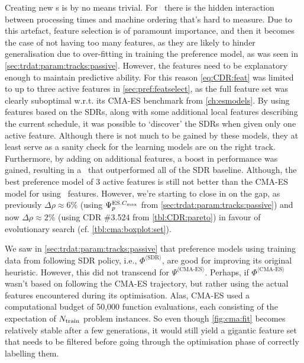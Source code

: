 Creating new \dr s is by no means trivial. For \jsp\ there is 
the hidden interaction between processing times and machine ordering that's 
hard to measure.
Due to this artefact, feature selection is of paramount importance, and then it 
becomes the case of not having too many features, as they are likely to hinder 
generalisation due to over-fitting in training the preference model, as was 
seen in \cref{sec:trdat:param:tracks:passive}. 
However, the features need to be explanatory enough to maintain predictive 
ability. 
For this reason \cref{eq:CDR:feat} was limited to up to three active features 
in \cref{sec:pref:featselect}, as the full feature set was clearly suboptimal 
w.r.t. its CMA-ES benchmark from \cref{ch:esmodels}. 
By using features based on the SDRs, along with some additional local features 
describing the current schedule, it was possible to `discover' the SDRs when 
given only one active feature. 
Although there is not much to be gained by these models, they at least serve as 
a sanity check for the learning models are on the right track. 
Furthermore, by adding on additional features, a boost in performance was 
gained, resulting in a \cdr\ that outperformed all of the SDR baseline. 
Although, the best preference model of 3 active features is still not better 
than the CMA-ES model for  using \NrFeatLocal\ features. 
However, we're starting to close in on the gap, as previously 
$\Delta\rho\approx6\%$ (using $\Psi_p^{\text{ES}.{C_{\max}}}$ from 
\cref{sec:trdat:param:tracks:passive}) and now $\Delta\rho\approx2\%$ (using 
CDR \#3.524 from \cref{tbl:CDR:pareto}) in favour of evolutionary search (cf. 
\cref{tbl:cma:boxplot:set}).



We saw in \cref{sec:trdat:param:tracks:passive} that preference models using 
training data from following SDR policy, i.e., $\Phi^{\langle \text{SDR} 
\rangle}$, are good for improving its original heuristic. However, this did not 
transcend for $\Psi^{\langle \text{CMA-ES} \rangle}$. 
Perhaps, if $\Phi^{\langle \text{CMA-ES} \rangle}$ wasn't based on following 
the CMA-ES trajectory, but rather using the actual features encountered during 
its optimisation. Alas, CMA-ES used a computational budget of 50,000 function 
evaluations, each consisting of the expectation of $N_{\text{train}}$ problem 
instances. So even though \cref{fig:cma:fit} becomes relatively stable after a 
few generations, it would still yield a gigantic feature set that needs to be 
filtered before going through the optimisation phase of correctly labelling 
them.

